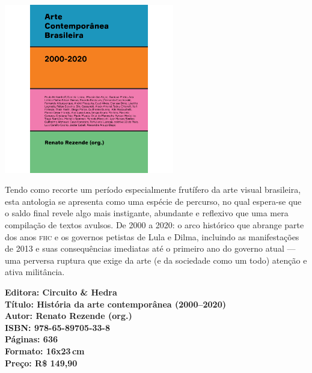 \begin{center}
\hspace*{.5cm}\includegraphics[width=74mm]{./CAPAS/CIRCUITO_REZENDE.jpg}
\end{center}
\hspace*{-7cm}\hrulefill\hspace*{-7cm}
\medskip

\noindent{}Tendo como recorte um período especialmente frutífero da arte visual brasileira, esta antologia se apresenta como uma espécie de percurso, no qual espera-se que o saldo final revele algo mais instigante, abundante e reflexivo que uma mera compilação de textos avulsos.  De 2000 a 2020: o arco histórico que abrange parte dos anos \textsc{fhc} e os governos petistas de Lula e Dilma, incluindo as manifestações de 2013 e suas consequências imediatas até o primeiro ano do governo atual --- uma perversa ruptura que exige da arte (e da sociedade como um todo) atenção e ativa militância.

\vfill
\noindent\begin{minipage}[c]{1\linewidth}
{\small\textbf{
\hspace*{-.1cm}Editora: Circuito \& Hedra\\
Título: História da arte contemporânea (2000–2020)\\
Autor: Renato Rezende (org.)\\ 
ISBN: 978-65-89705-33-8\\
Páginas: 636\\
Formato: 16x23\,cm\\
Preço: R\$ 149,90\\
}}
\end{minipage}
\pagebreak

